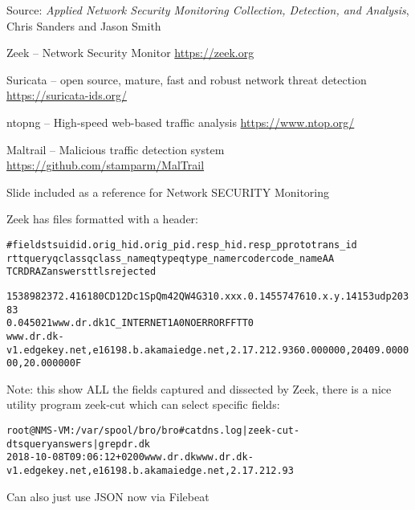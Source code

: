 \documentclass[Screen16to9,17pt]{foils}
\begin{document}
Source: \emph{Applied Network Security Monitoring Collection, Detection, and Analysis}, Chris Sanders and Jason Smith





\begin{list1}
\item Zeek -- Network Security Monitor {\footnotesize\url{https://zeek.org}} 
\item Suricata -- open source, mature, fast and robust network threat detection {\footnotesize\url{https://suricata-ids.org/}}
\item ntopng -- High-speed web-based traffic analysis  {\footnotesize\url{https://www.ntop.org/}}
\item Maltrail -- Malicious traffic detection system {\footnotesize\url{https://github.com/stamparm/MalTrail}}
\end{list1}

Slide included as a reference for Network SECURITY Monitoring



Zeek has files formatted with a header:
\begin{alltt}\footnotesize
#fields ts      uid     id.orig_h       id.orig_p       id.resp_h       id.resp_p       proto   trans_id
        rtt     query   qclass  qclass_name     qtype   qtype_name      rcode   rcode_name      AA
        TC      RD      RA      Z       answers ttls    rejected

1538982372.416180	CD12Dc1SpQm42QW4G3	10.xxx.0.145	57476	10.x.y.141	53	udp	20383
	0.045021	www.dr.dk	1	C_INTERNET	1	A	0	NOERROR	F	F	T	T	0
   www.dr.dk-v1.edgekey.net,e16198.b.akamaiedge.net,2.17.212.93	60.000000,20409.000000,20.000000	F
\end{alltt}

Note: this show ALL the fields captured and dissected by Zeek, there is a nice utility program zeek-cut which can select specific fields:

\begin{alltt}\small
root@NMS-VM:/var/spool/bro/bro# cat dns.log | zeek-cut -d ts query answers | grep dr.dk
2018-10-08T09:06:12+0200	www.dr.dk	www.dr.dk-v1.edgekey.net,e16198.b.akamaiedge.net,2.17.212.93
\end{alltt}

Can also just use JSON now via Filebeat
\end{document}
